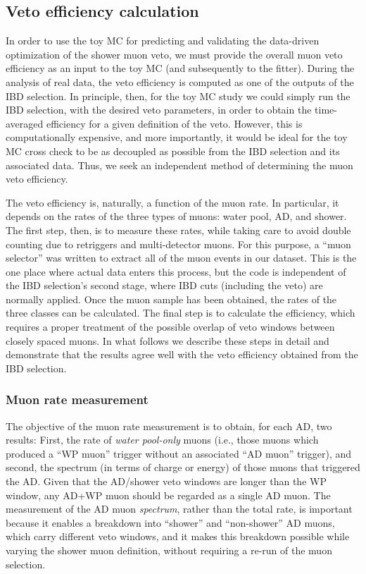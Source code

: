\documentclass[../thesis.tex]{subfiles}
\begin{document}
\subsection{Veto efficiency calculation}%
\label{sec:cutVaryMuVetoEff}

In order to use the toy MC for predicting and validating the data-driven optimization of the shower muon veto, we must provide the overall muon veto efficiency as an input to the toy MC (and subsequently to the fitter). During the analysis of real data, the veto efficiency is computed as one of the outputs of the IBD selection. In principle, then, for the toy MC study we could simply run the IBD selection, with the desired veto parameters, in order to obtain the time-averaged efficiency for a given definition of the veto. However, this is computationally expensive, and more importantly, it would be ideal for the toy MC cross check to be as decoupled as possible from the IBD selection and its associated data. Thus, we seek an independent method of determining the muon veto efficiency.

The veto efficiency is, naturally, a function of the muon rate. In particular, it depends on the rates of the three types of muons: water pool, AD, and shower. The first step, then, is to measure these rates, while taking care to avoid double counting due to retriggers and multi-detector muons. For this purpose, a ``muon selector'' was written to extract all of the muon events in our dataset. This is the one place where actual data enters this process, but the code is independent of the IBD selection's second stage, where IBD cuts (including the veto) are normally applied. Once the muon sample has been obtained, the rates of the three classes can be calculated. The final step is to calculate the efficiency, which requires a proper treatment of the possible overlap of veto windows between closely spaced muons. In what follows we describe these steps in detail and demonstrate that the results agree well with the veto efficiency obtained from the IBD selection.

\subsubsection{Muon rate measurement}%
\label{sec:cutVaryMuRate}

The objective of the muon rate measurement is to obtain, for each AD, two results: First, the rate of \emph{water pool-only} muons (i.e., those muons which produced a ``WP muon'' trigger without an associated ``AD muon'' trigger), and second, the spectrum (in terms of charge or energy) of those muons that triggered the AD\@. Given that the AD/shower veto windows are longer than the WP window, any AD+WP muon should be regarded as a single AD muon. The measurement of the AD muon \emph{spectrum}, rather than the total rate, is important because it enables a breakdown into ``shower'' and ``non-shower'' AD muons, which carry different veto windows, and it makes this breakdown possible while varying the shower muon definition, without requiring a re-run of the muon selection.
\end{document}
